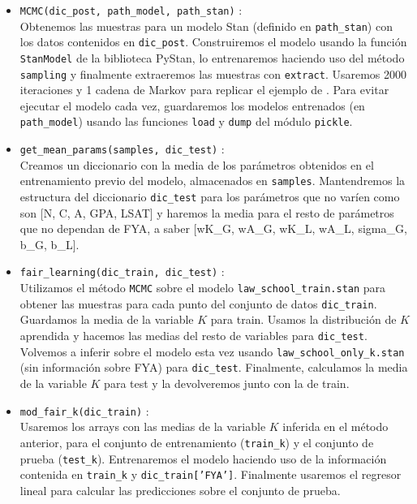\documentclass[oneside,openright,titlepage,numbers=noenddot,openany,headinclude,footinclude=true,
cleardoublepage=empty,abstractoff,BCOR=5mm,paper=a4,fontsize=12pt,main=spanish]{scrreprt}
\begin{document}
\begin{itemize}
    \item \texttt{MCMC(dic\_post, path\_model, path\_stan)} :\\
    Obtenemos las muestras para un modelo Stan (definido en \texttt{path\_stan}) con los datos contenidos en \texttt{dic\_post}. Construiremos el modelo usando la función \texttt{StanModel} de la biblioteca PyStan, lo entrenaremos haciendo uso del método \texttt{sampling} y finalmente extraeremos las muestras con \texttt{extract}. Usaremos 2000 iteraciones y 1 cadena de Markov para replicar el ejemplo de \cite{counterfactual2018}. Para evitar ejecutar el modelo cada vez, guardaremos los modelos entrenados (en \texttt{path\_model}) usando las funciones \texttt{load} y \texttt{dump} del módulo \texttt{pickle}.\\
    \item \texttt{get\_mean\_params(samples, dic\_test)} :\\
    Creamos un diccionario con la media de los parámetros obtenidos en el entrenamiento previo del modelo, almacenados en \texttt{samples}. Mantendremos la estructura del diccionario \texttt{dic\_test} para los parámetros que no varíen como son [N, C, A, GPA, LSAT] y haremos la media para el resto de parámetros que no dependan de FYA, a saber [wK\_G, wA\_G, wK\_L, wA\_L, sigma\_G, b\_G, b\_L].\\
    \item \texttt{fair\_learning(dic\_train, dic\_test)} :\\
    Utilizamos el método \texttt{MCMC} sobre el modelo \texttt{law\_school\_train.stan} para obtener las muestras para cada punto del conjunto de datos \texttt{dic\_train}. Guardamos la media de la variable $K$ para train. Usamos la distribución de $K$ aprendida y hacemos las medias del resto de variables para \texttt{dic\_test}. Volvemos a inferir sobre el modelo esta vez usando \texttt{law\_school\_only\_k.stan} (sin información sobre FYA) para \texttt{dic\_test}. Finalmente, calculamos la media de la variable $K$ para test y la devolveremos junto con la de train.\\
    \item \texttt{mod\_fair\_k(dic\_train)} :\\
    Usaremos los arrays con las medias de la variable $K$ inferida en el método anterior, para el conjunto de entrenamiento (\texttt{train\_k}) y el conjunto de prueba (\texttt{test\_k}). Entrenaremos el modelo haciendo uso de la información contenida en \texttt{train\_k} y \texttt{dic\_train['FYA']}. Finalmente usaremos el regresor lineal para calcular las predicciones sobre el conjunto de prueba.
\end{itemize}
\end{document}
